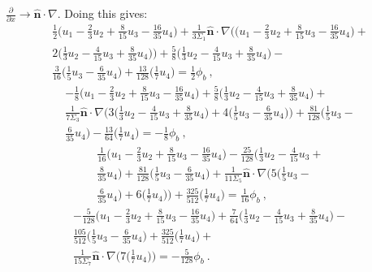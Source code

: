 \documentclass[letterpaper,12pt]{article}
\begin{document}
$\frac{\partial}{\partial x} \rightarrow
\hat{\mathbf{n}}\cdot\nabla$. Doing this gives:
\begin{multline}
    \frac{1}{2}\Big(u_1 - \frac{2}{3}u_2 + \frac{8}{15}u_3 -
    \frac{16}{35}u_4\Big) +
    \frac{1}{3\Sigma_1}\hat{\mathbf{n}}\cdot\nabla\Big(\Big(u_1 -
    \frac{2}{3}u_2 + \frac{8}{15}u_3 -
    \frac{16}{35}u_4\Big)+\\2\Big(\frac{1}{3}u_2 - \frac{4}{15}u_3 +
    \frac{8}{35}u_4\Big)\Big) + \frac{5}{8}\Big(\frac{1}{3}u_2 -
    \frac{4}{15}u_3 + \frac{8}{35}u_4\Big)
    -\\ \frac{3}{16}\Big(\frac{1}{5}u_3 - \frac{6}{35}u_4\Big) +
    \frac{13}{128}\Big(\frac{1}{7}u_4\Big) = \frac{1}{2}\phi_{b}\:,
\end{multline}
\begin{multline}
    -\frac{1}{8}\Big(u_1 - \frac{2}{3}u_2 + \frac{8}{15}u_3 -
    \frac{16}{35}u_4\Big) + \frac{5}{8}\Big(\frac{1}{3}u_2 -
    \frac{4}{15}u_3 + \frac{8}{35}u_4\Big)
    +\\ \frac{1}{7\Sigma_3}\hat{\mathbf{n}}\cdot\nabla\Big
    (3\Big(\frac{1}{3}u_2 - \frac{4}{15}u_3 + \frac{8}{35}u_4\Big) +
    4\Big(\frac{1}{5}u_3 - \frac{6}{35}u_4\Big)\Big) +
    \frac{81}{128}\Big(\frac{1}{5}u_3 -\\ \frac{6}{35}u_4\Big) -
    \frac{13}{64}\Big(\frac{1}{7}u_4\Big) = -\frac{1}{8}\phi_{b}\:,
\end{multline}
\begin{multline}
    \frac{1}{16}\Big(u_1 - \frac{2}{3}u_2 + \frac{8}{15}u_3 -
    \frac{16}{35}u_4\Big) - \frac{25}{128}\Big(\frac{1}{3}u_2 -
    \frac{4}{15}u_3 +\\ \frac{8}{35}u_4\Big) +
    \frac{81}{128}\Big(\frac{1}{5}u_3 - \frac{6}{35}u_4\Big) +
    \frac{1}{11\Sigma_5}\hat{\mathbf{n}}\cdot\nabla\Big(5\Big(\frac{1}{5}u_3
    -\\ \frac{6}{35}u_4\Big) + 6\Big(\frac{1}{7}u_4\Big)\Big) +
    \frac{325}{512}\Big(\frac{1}{7}u_4\Big) = \frac{1}{16}\phi_{b}\:,
\end{multline}
\begin{multline}
    -\frac{5}{128}\Big(u_1 - \frac{2}{3}u_2 + \frac{8}{15}u_3 -
    \frac{16}{35}u_4\Big) + \frac{7}{64}\Big(\frac{1}{3}u_2 -
    \frac{4}{15}u_3 + \frac{8}{35}u_4\Big)
    -\\ \frac{105}{512}\Big(\frac{1}{5}u_3 - \frac{6}{35}u_4\Big) +
    \frac{325}{512}\Big(\frac{1}{7}u_4\Big)
    +\\ \frac{1}{15\Sigma_7}\hat{\mathbf{n}}
    \cdot\nabla\Big(7\Big(\frac{1}{7}u_4\Big)\Big) =
    -\frac{5}{128}\phi_{b}\:.
\end{multline}
\end{document}
